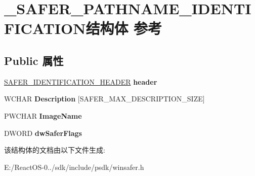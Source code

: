 \hypertarget{struct___s_a_f_e_r___p_a_t_h_n_a_m_e___i_d_e_n_t_i_f_i_c_a_t_i_o_n}{}\section{\+\_\+\+S\+A\+F\+E\+R\+\_\+\+P\+A\+T\+H\+N\+A\+M\+E\+\_\+\+I\+D\+E\+N\+T\+I\+F\+I\+C\+A\+T\+I\+O\+N结构体 参考}
\label{struct___s_a_f_e_r___p_a_t_h_n_a_m_e___i_d_e_n_t_i_f_i_c_a_t_i_o_n}
\subsection*{Public 属性}
\begin{DoxyCompactItemize}
\item 
\mbox{\label{struct___s_a_f_e_r___p_a_t_h_n_a_m_e___i_d_e_n_t_i_f_i_c_a_t_i_o_n_a5203aa0da2b196caf147031beaa7a41b}} 
\hyperlink{struct___s_a_f_e_r___i_d_e_n_t_i_f_i_c_a_t_i_o_n___h_e_a_d_e_r}{S\+A\+F\+E\+R\+\_\+\+I\+D\+E\+N\+T\+I\+F\+I\+C\+A\+T\+I\+O\+N\+\_\+\+H\+E\+A\+D\+ER} {\bfseries header}
\item 
\mbox{\label{struct___s_a_f_e_r___p_a_t_h_n_a_m_e___i_d_e_n_t_i_f_i_c_a_t_i_o_n_a203a4aa1547852f78fc2d590750497ea}} 
W\+C\+H\+AR {\bfseries Description} \mbox{[}S\+A\+F\+E\+R\+\_\+\+M\+A\+X\+\_\+\+D\+E\+S\+C\+R\+I\+P\+T\+I\+O\+N\+\_\+\+S\+I\+ZE\mbox{]}
\item 
\mbox{\label{struct___s_a_f_e_r___p_a_t_h_n_a_m_e___i_d_e_n_t_i_f_i_c_a_t_i_o_n_a28c9a9e41630a35584338c8c53c278fb}} 
P\+W\+C\+H\+AR {\bfseries Image\+Name}
\item 
\mbox{\label{struct___s_a_f_e_r___p_a_t_h_n_a_m_e___i_d_e_n_t_i_f_i_c_a_t_i_o_n_abe0603c2712e15ba6ebb69877b7083c9}} 
D\+W\+O\+RD {\bfseries dw\+Safer\+Flags}
\end{DoxyCompactItemize}


该结构体的文档由以下文件生成\+:\begin{DoxyCompactItemize}
\item 
E\+:/\+React\+O\+S-\/0../sdk/include/psdk/winsafer.\+h\end{DoxyCompactItemize}
